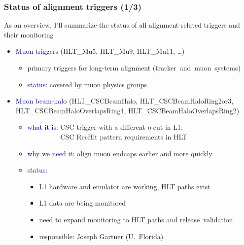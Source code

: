 \documentclass[compress]{beamer}
\begin{document}
\begin{frame}
\frametitle{Status of alignment triggers (1/3)}

\vfill
As an overview, I'll summarize the status of all alignment-related triggers and their monitoring

\vfill
\begin{itemize}\setlength{\itemsep}{0.5 cm}
\item \textcolor{darkblue}{Muon triggers} {\scriptsize (HLT\_Mu5, HLT\_Mu9, HLT\_Mu11, \ldots)}
\begin{itemize}
\item primary triggers for long-term alignment \mbox{(tracker and muon systems)\hspace{-1 cm}}
\item \textcolor{darkblue}{status:} covered by muon physics groups
\end{itemize}

\item \textcolor{darkblue}{Muon beam-halo} {\scriptsize (HLT\_CSCBeamHalo, HLT\_CSCBeamHaloRing2or3, HLT\_CSCBeamHaloOverlapsRing1, HLT\_CSCBeamHaloOverlapsRing2)}
\begin{itemize}
\item \textcolor{darkblue}{what it is:} CSC trigger with a different $\eta$ cut in L1, \\ \textcolor{white}{what it is:} CSC RecHit pattern requirements in HLT
\item \textcolor{darkblue}{why we need it:} align muon endcaps earlier and more quickly
\item \textcolor{darkblue}{status:}
\begin{itemize}
\item L1 hardware and emulator are working, HLT paths exist
\item L1 data are being monitored
\item need to expand monitoring to HLT paths and \mbox{release validation\hspace{-1 cm}}
\item responsible: Joseph Gartner (U.\ Florida)
\end{itemize}
\end{itemize}

\end{itemize}
\end{frame}
\end{document}
